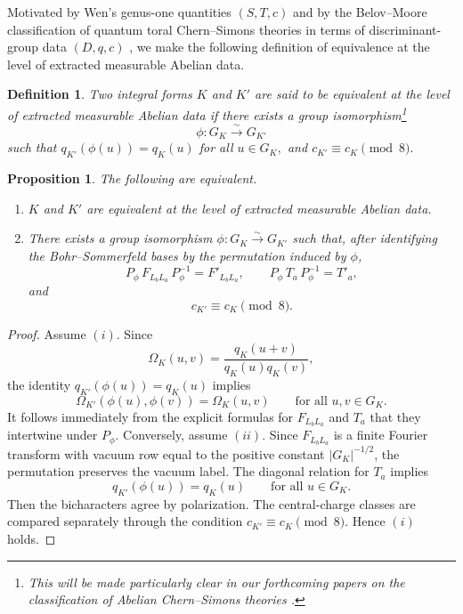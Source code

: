 \documentclass[12pt]{amsart}
\numberwithin{equation}{section}
\newtheorem{prop}[theorem]{Proposition}
\newtheorem{definition}[theorem]{Definition}
\begin{document}
Motivated by Wen's genus-one quantities \((S,T,c)\) and by the Belov--Moore classification of quantum toral Chern--Simons theories in terms of discriminant-group data \((D,q,c)\) \cite{BelovMoore,Stirling}, we make the following definition of equivalence at the level of extracted measurable Abelian data.


\begin{definition}
Two integral forms \(K\) and \(K'\) are said to be \emph{equivalent at the level of
extracted measurable Abelian data} if there exists a group isomorphism\footnote{This will be made particularly clear in our forthcoming papers on the classification of Abelian Chern--Simons theories \cite{galviz3, galviz4}.}
\[
\phi:G_K\overset{\sim}{\longrightarrow} G_{K'}
\]
such that $q_{K'}(\phi(u))=q_K(u)$ for all $u\in G_K,$ and $c_{K'}\equiv c_K\pmod 8.$
\end{definition}

\begin{prop}
The following are equivalent.
\begin{enumerate}[label=(\roman*)]
\item
\(K\) and \(K'\) are equivalent at the level of extracted measurable Abelian data.

\item
There exists a group isomorphism \(\phi:G_K\overset{\sim}{\longrightarrow}G_{K'}\) such that,
after identifying the Bohr--Sommerfeld bases by the permutation induced by \(\phi\),
\[
P_\phi\,F_{L_bL_a}\,P_\phi^{-1}=F'_{L_bL_a},
\qquad
P_\phi\,T_a\,P_\phi^{-1}=T'_a,
\]
and
\[
c_{K'}\equiv c_K\pmod 8.
\]
\end{enumerate}
\end{prop} 
\begin{proof}
Assume \((i)\). Since
\[
\Omega_K(u,v)=\frac{q_K(u+v)}{q_K(u)q_K(v)},
\]
the identity \(q_{K'}(\phi(u))=q_K(u)\) implies
\[
\Omega_{K'}(\phi(u),\phi(v))=\Omega_K(u,v)
\qquad\text{for all }u,v\in G_K.
\]
It follows immediately from the explicit formulas for \(F_{L_bL_a}\) and \(T_a\) that they
intertwine under \(P_\phi\). Conversely, assume \((ii)\). Since \(F_{L_bL_a}\) is a finite Fourier transform with vacuum row
equal to the positive constant \(|G_K|^{-1/2}\), the permutation preserves the vacuum label.
The diagonal relation for \(T_a\) implies
\[
q_{K'}(\phi(u))=q_K(u)
\qquad\text{for all }u\in G_K.
\]
Then the bicharacters agree by polarization. The central-charge classes are compared
separately through the condition \(c_{K'}\equiv c_K\pmod 8\). Hence \((i)\) holds.
\end{proof}
\end{document}

